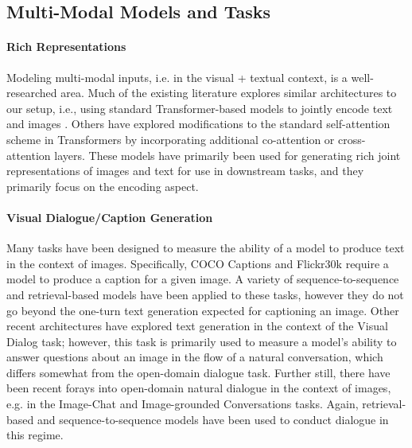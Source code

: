 \documentclass[11pt,a4paper]{article}
\begin{document}
\subsection{Multi-Modal Models and Tasks}

\paragraph{Rich Representations} 
Modeling multi-modal inputs, i.e. in the visual + textual context, is a well-researched area. Much of the existing literature explores similar architectures to our setup, i.e., using standard Transformer-based models to jointly encode text and images \cite{li2019visualbert, kiela2019supervised}. Others have explored modifications to the standard self-attention scheme in Transformers by incorporating additional co-attention \cite{NIPS2019_8297, tan-bansal-2019-lxmert} or cross-attention \cite{stefanini2020novel} layers. These models have primarily been used for generating rich joint representations of images and text for use in downstream tasks, and they primarily focus on the encoding aspect. 

\paragraph{Visual Dialogue/Caption Generation} Many tasks have been designed to measure the ability of a model to produce text in the context of images. Specifically, COCO Captions \cite{chen2015microsoft} and Flickr30k \cite{young2014image} require a model to produce a caption for a given image. A variety of sequence-to-sequence \cite{vinyals2015show,xu2015show,anderson2017bottom} and retrieval-based \cite{8578848,faghri2018vse++,Nam2016DualAN} models have been applied to these tasks, however they do not go beyond the one-turn text generation expected for captioning an image. Other recent architectures have explored text generation \cite{wang2020vdbert, park2020multiview} in the context of the Visual Dialog \cite{visdial} task; however, this task is primarily used to measure a model's ability to answer questions about an image in the flow of a natural conversation, which differs somewhat from the open-domain dialogue task. Further still, there have been recent forays into open-domain natural dialogue in the context of images, e.g. in the Image-Chat \cite{shuster2020image} and Image-grounded Conversations \cite{mostafazadeh-etal-2017-image} tasks. Again, retrieval-based \cite{shuster2020image,ju2019allinone} and sequence-to-sequence \cite{shuster2019dialogue, shuster2020image} models have been used to conduct dialogue in this regime. 
\end{document}
